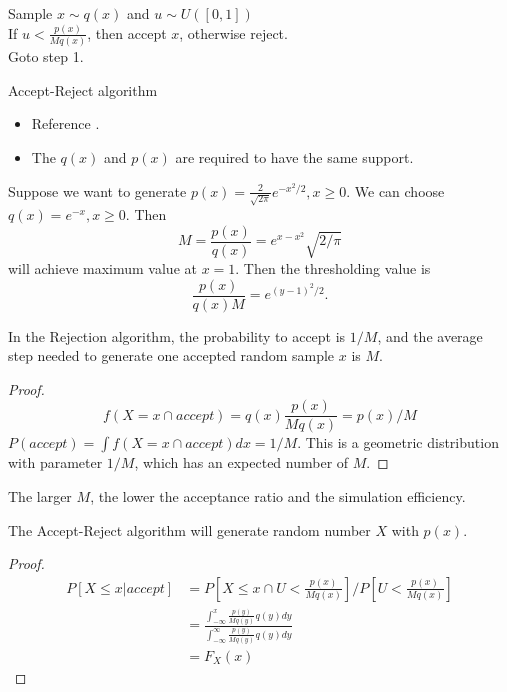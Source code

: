 \begin{refsection}
\begin{algorithm}[H]
	\SetAlgoLined
	Sample $x\sim q(x)$ and $u \sim U([0,1])$\\
	If $u < \frac{p(x)}{Mq(x)}$, then accept $x$, otherwise reject.\\
	Goto step 1.\\
	\caption{Accept-Reject algorithm }
\end{algorithm}

\begin{remark}\hfill
	\begin{itemize}
		\item Reference \cite{andrieu2003introduction}\cite[272]{hoggintroduction}.
		\item The $q(x)$ and $p(x)$ are required to have the same support.
	\end{itemize}
\end{remark}

\begin{example}
	Suppose we want to generate 
	$p(x) = \frac{2}{\sqrt{2\pi}} e^{-x^2/2},x\geq 0$. We can choose $q(x) = e^{-x},x\geq 0$. Then 
	$$M = \frac{p(x)}{q(x)} = e^{x-x^2}\sqrt{2/\pi}$$
	will achieve maximum value at $x=1$. 
	Then the thresholding value is $$\frac{p(x)}{q(x)M} = e^{(y-1)^2/2}.$$
\end{example}


\begin{lemma}
	In the Rejection algorithm, the probability to accept is $1/M$, and the average step needed to generate one accepted random sample $x$ is $M$.
\end{lemma}
\begin{proof}
	$$f(X = x \cap accept) = q(x)\frac{p(x)}{Mq(x)} = p(x)/M $$
	$P(accept) = \int f(X = x \cap accept) dx =1/M$.
	This is a geometric distribution with parameter $1/M$, which has an expected number of $M$.
\end{proof}


\begin{remark}[implication]
	The larger $M$, the lower the acceptance ratio and the simulation efficiency.	
\end{remark}

\begin{lemma}
	The Accept-Reject algorithm will generate random number $X$ with $p(x)$.
\end{lemma}
\begin{proof}
	\begin{align*}
	P[X \leq x | accept] &= P[X\leq x \cap U < \frac{p(x)}{Mq(x)}]/P[U < \frac{p(x)}{Mq(x)}]\\
	&=\frac{\int_{-\infty}^x \frac{p(y)}{Mq(y)}q(y)dy}{\int_{-\infty}^\infty \frac{p(y)}{Mq(y)}q(y)dy}\\
	& = F_X(x)
	\end{align*}
\end{proof}


\end{refsection}
